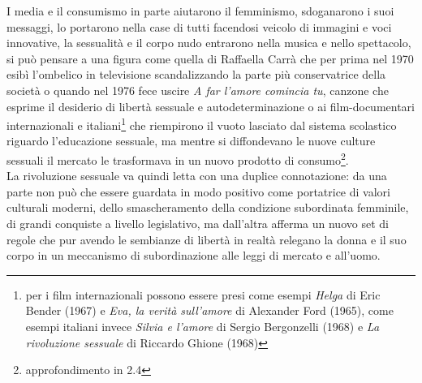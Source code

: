 I media e il consumismo in parte aiutarono il femminismo, sdoganarono i suoi messaggi, lo portarono nella case di tutti facendosi veicolo di immagini e voci innovative, la sessualità e il corpo nudo entrarono nella musica e nello spettacolo, si può pensare a una figura come quella di Raffaella Carrà che per prima nel 1970 esibì l'ombelico in televisione scandalizzando la parte più conservatrice della società o quando nel 1976 fece uscire \textit{A far l'amore comincia tu}, canzone che esprime il desiderio di libertà sessuale e autodeterminazione o ai film-documentari internazionali e italiani\footnote{per i film internazionali possono essere presi come esempi \textit{Helga} di Eric Bender (1967) e \textit{Eva, la verità sull'amore} di Alexander Ford (1965), come esempi italiani invece \textit{Silvia e l'amore} di Sergio Bergonzelli (1968) e \textit{La rivoluzione sessuale} di Riccardo Ghione (1968)} che riempirono il vuoto lasciato dal sistema scolastico riguardo l'educazione sessuale, ma mentre si diffondevano le nuove culture sessuali il mercato le trasformava in un nuovo prodotto di consumo\footnote{approfondimento in 2.4}.
\\La rivoluzione sessuale va quindi letta con una duplice connotazione: da una parte non può che essere guardata in modo positivo come portatrice di valori culturali moderni, dello smascheramento della condizione subordinata femminile, di grandi conquiste a livello legislativo, ma dall'altra afferma un nuovo set di regole che pur avendo le sembianze di libertà in realtà relegano la donna e il suo corpo in un meccanismo di subordinazione alle leggi di mercato e all'uomo.

